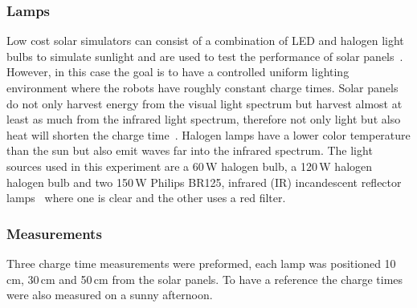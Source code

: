 \begin{table}[t]
	\centering
\end{table}


\subsubsection{Lamps}
Low cost solar simulators can consist of a combination of LED and halogen light bulbs to simulate sunlight and are used to test the performance of solar panels~\cite{grandi_tia_2014}.
However, in this case the goal is to have a controlled uniform lighting environment where the robots have roughly constant charge times.
Solar panels do not only harvest energy from the visual light spectrum but harvest almost at least as much from the infrared light spectrum, therefore not only light but also heat will shorten the charge time~\cite{ixolar_slmd121h04l_2017}.
Halogen lamps have a lower color temperature than the sun but also emit waves far into the infrared spectrum.
The light sources used in this experiment are a 60\,W halogen bulb, a 120\,W halogen halogen bulb and two 150\,W Philips  BR125, infrared (IR) incandescent reflector lamps~\cite{philips_irlamp_2017} where one is clear and the other uses a red filter.

\subsubsection{Measurements}
Three charge time measurements were preformed, each lamp was positioned 10\,cm, 30\,cm and 50\,cm from the solar panels.
To have a reference the charge times were also measured on a sunny afternoon. 

